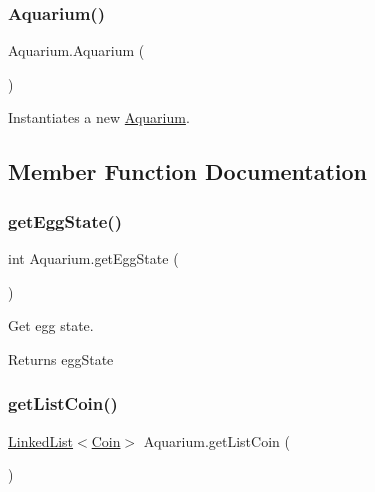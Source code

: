 \subsubsection{\texorpdfstring{Aquarium()}{Aquarium()}}
{\footnotesize\ttfamily Aquarium.\+Aquarium (\begin{DoxyParamCaption}{ }\end{DoxyParamCaption})\hspace{0.3cm}{\ttfamily [inline]}}

Instantiates a new \mbox{\hyperlink{class_aquarium}{Aquarium}}. 

\subsection{Member Function Documentation}
\mbox{\label{class_aquarium_a081f2e1e4de0b98da501d2d067a3de0a}} 
\subsubsection{\texorpdfstring{get\+Egg\+State()}{getEggState()}}
{\footnotesize\ttfamily int Aquarium.\+get\+Egg\+State (\begin{DoxyParamCaption}{ }\end{DoxyParamCaption})\hspace{0.3cm}{\ttfamily [inline]}}

Get egg state.

\begin{DoxyReturn}{Returns}
egg\+State 
\end{DoxyReturn}
\mbox{\label{class_aquarium_ad7e90e4a2cd4a8810dfd497ba0f5375f}} 
\subsubsection{\texorpdfstring{get\+List\+Coin()}{getListCoin()}}
{\footnotesize\ttfamily \mbox{\hyperlink{class_linked_list}{Linked\+List}}$<$\mbox{\hyperlink{class_coin}{Coin}}$>$ Aquarium.\+get\+List\+Coin (\begin{DoxyParamCaption}{ }\end{DoxyParamCaption})\hspace{0.3cm}{\ttfamily [inline]}}

